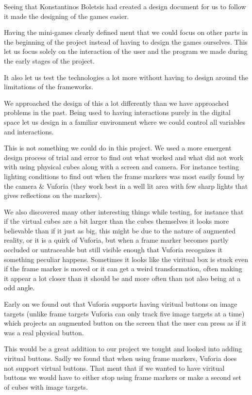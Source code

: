 Seeing that Konstantinos Boletsis had created a design document for us to follow it made the designing of the games easier.


Having the mini-games clearly defined ment that we could focus on other parts in the beginning of the project instead of having to design the games ourselves.
This let us focus solely on the interaction of the user and the program we made during the early stages of the project.

It also let us test the technologies a lot more without having to design around the limitations of the frameworks.


We approached the design of this a lot differently than we have approached problems in the past.
Being used to having interactions purely in the digital space let us design in a familiar environment where we could control all variables and interactions.

This is not something we could do in this project. 
We used a more emergent design process of trial and error to find out what worked and what did not work with using physical cubes along with a screen and camera.
For instance testing lighting conditions to find out when the frame markers was most easily found by the camera \& Vuforia (they work best in a well lit area with few sharp lights that gives reflections on the markers).

We also discovered many other interesting things while testing, for instance that if the virtual cubes are a bit larger than the cubes themselves it looks more believable than if it just as big,
 this might be due to the nature of augmented reality, or it is a quirk of Vuforia, but when a frame marker becomes partly occluded or untraceable but still visible enough that Vuforia recognizes it something peculiar happens.
Sometimes it looks like the viritual box is stuck even if the frame marker is moved or it can get a weird transformation, often making it appear a lot closer than it should be and more often than not also being at a odd angle.


Early on we found out that Vuforia supports having viritual buttons on image targets (unlike frame targets Vuforia can only track five image targets at a time) which projects an augmented button on the screen that the user can press as if it was a real physical button.

This would be a great addition to our project we tought and looked into adding viritual buttons.
Sadly we found that when using frame markers, Vuforia does not support virtual buttons. That ment that if we wanted to have viritual buttons we would have to either stop using frame markers or make a second set of cubes with image targets.

